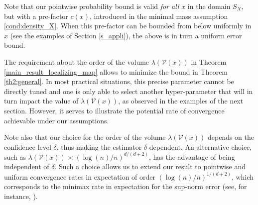 \documentclass[paper=a4, fontsize=11pt]{scrartcl}
\begin{document}
Note that our pointwise probability bound is valid \textit{for all} $x$ in the domain $S_X$, but with a pre-factor $c(x)$, introduced in the minimal mass assumption \ref{cond:density_X}. When this pre-factor can be bounded from below uniformly in $x$ (see the examples of Section \ref{s_appli}), the above is in turn a uniform error bound.


The requirement about the order of the volume $\lambda(\mathcal V(x)) $ in Theorem \ref{main_result_localizing_map} allows to minimize the bound in Theorem \ref{th2:general}. In most practical situations, this precise parameter cannot be directly tuned and one is only able to select another hyper-parameter that will in turn impact the value of $\lambda(\mathcal V(x))$, as observed in the examples of the next section. However, it serves to illustrate the potential rate of convergence achievable under our assumptions.

Note also that our choice for the order of the volume $\lambda(\mathcal V(x))$ depends on the confidence level $\delta$, thus making the estimator $\delta$-dependent. An alternative choice, such as $\lambda(\mathcal V(x)) \asymp (\log(n) / n)^{d/(d+2)}$, has the advantage of being independent of $\delta$.
Such a choice allows us to extend our result to pointwise and uniform convergence rates in expectation of order $(\log(n)/n)^{1/(d+2)}$, which corresponds to the minimax rate in expectation for the sup-norm error (see, for instance, \citep{tsybakov2009}). 
\end{document}
